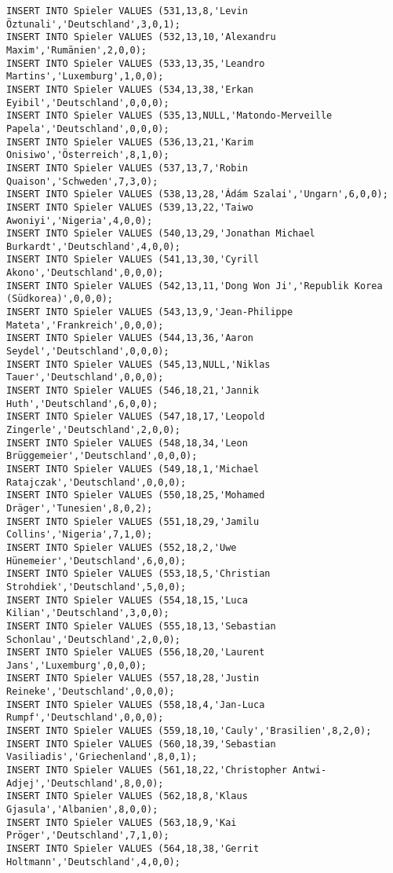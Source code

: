 \documentclass{lehramt-informatik-aufgabe}
\begin{document}
\begin{verbatim}
INSERT INTO Spieler VALUES (531,13,8,'Levin Öztunali','Deutschland',3,0,1);
INSERT INTO Spieler VALUES (532,13,10,'Alexandru Maxim','Rumänien',2,0,0);
INSERT INTO Spieler VALUES (533,13,35,'Leandro Martins','Luxemburg',1,0,0);
INSERT INTO Spieler VALUES (534,13,38,'Erkan Eyibil','Deutschland',0,0,0);
INSERT INTO Spieler VALUES (535,13,NULL,'Matondo-Merveille Papela','Deutschland',0,0,0);
INSERT INTO Spieler VALUES (536,13,21,'Karim Onisiwo','Österreich',8,1,0);
INSERT INTO Spieler VALUES (537,13,7,'Robin Quaison','Schweden',7,3,0);
INSERT INTO Spieler VALUES (538,13,28,'Ádám Szalai','Ungarn',6,0,0);
INSERT INTO Spieler VALUES (539,13,22,'Taiwo Awoniyi','Nigeria',4,0,0);
INSERT INTO Spieler VALUES (540,13,29,'Jonathan Michael Burkardt','Deutschland',4,0,0);
INSERT INTO Spieler VALUES (541,13,30,'Cyrill Akono','Deutschland',0,0,0);
INSERT INTO Spieler VALUES (542,13,11,'Dong Won Ji','Republik Korea (Südkorea)',0,0,0);
INSERT INTO Spieler VALUES (543,13,9,'Jean-Philippe Mateta','Frankreich',0,0,0);
INSERT INTO Spieler VALUES (544,13,36,'Aaron Seydel','Deutschland',0,0,0);
INSERT INTO Spieler VALUES (545,13,NULL,'Niklas Tauer','Deutschland',0,0,0);
INSERT INTO Spieler VALUES (546,18,21,'Jannik Huth','Deutschland',6,0,0);
INSERT INTO Spieler VALUES (547,18,17,'Leopold Zingerle','Deutschland',2,0,0);
INSERT INTO Spieler VALUES (548,18,34,'Leon Brüggemeier','Deutschland',0,0,0);
INSERT INTO Spieler VALUES (549,18,1,'Michael Ratajczak','Deutschland',0,0,0);
INSERT INTO Spieler VALUES (550,18,25,'Mohamed Dräger','Tunesien',8,0,2);
INSERT INTO Spieler VALUES (551,18,29,'Jamilu Collins','Nigeria',7,1,0);
INSERT INTO Spieler VALUES (552,18,2,'Uwe Hünemeier','Deutschland',6,0,0);
INSERT INTO Spieler VALUES (553,18,5,'Christian Strohdiek','Deutschland',5,0,0);
INSERT INTO Spieler VALUES (554,18,15,'Luca Kilian','Deutschland',3,0,0);
INSERT INTO Spieler VALUES (555,18,13,'Sebastian Schonlau','Deutschland',2,0,0);
INSERT INTO Spieler VALUES (556,18,20,'Laurent Jans','Luxemburg',0,0,0);
INSERT INTO Spieler VALUES (557,18,28,'Justin Reineke','Deutschland',0,0,0);
INSERT INTO Spieler VALUES (558,18,4,'Jan-Luca Rumpf','Deutschland',0,0,0);
INSERT INTO Spieler VALUES (559,18,10,'Cauly','Brasilien',8,2,0);
INSERT INTO Spieler VALUES (560,18,39,'Sebastian Vasiliadis','Griechenland',8,0,1);
INSERT INTO Spieler VALUES (561,18,22,'Christopher Antwi-Adjej','Deutschland',8,0,0);
INSERT INTO Spieler VALUES (562,18,8,'Klaus Gjasula','Albanien',8,0,0);
INSERT INTO Spieler VALUES (563,18,9,'Kai Pröger','Deutschland',7,1,0);
INSERT INTO Spieler VALUES (564,18,38,'Gerrit Holtmann','Deutschland',4,0,0);

\end{verbatim}
\end{document}
